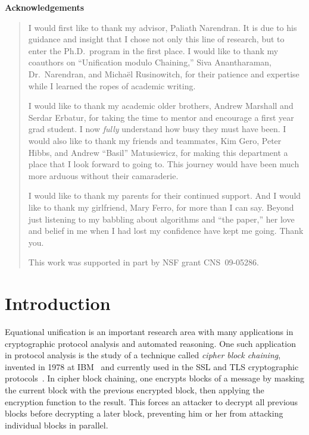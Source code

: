 \documentclass[11pt,twoside,titlepage]{article}
\begin{document}
\clearpage

\begin{center}
    \textbf{Acknowledgements}
\end{center}
\begin{quotation}
I would first like to thank my advisor, Paliath Narendran. It is due to his
guidance and insight that I chose not only this line of research, but to enter
the Ph.D.\ program in the first place.
I would like to thank my coauthors on ``Unification modulo Chaining,'' Siva
Anantharaman, Dr.\ Narendran, and Micha\"{e}l Rusinowitch, for their patience
and expertise while I learned the ropes of academic writing.

I would like to thank my academic older brothers, Andrew Marshall and Serdar
Erbatur, for taking the time to mentor and encourage a first year grad student.
I now \emph{ful{}ly} understand how busy they must have been.
I would also like to thank my friends and teammates, Kim Gero, Peter Hibbs, and
Andrew ``Basil'' Matusiewicz, for making this department a place that I look
forward to going to. This journey would have been much more arduous without
their camaraderie.

I would like to thank my parents for their continued support.
And I would like to thank my girlfriend, Mary Ferro, for more than I can say.
Beyond just listening to my babbling about algorithms and ``the paper,'' her
love and belief in me when I had lost my confidence have kept me going. Thank
you.

This work was supported in part by NSF grant CNS~09-05286.
\end{quotation}

\clearpage
\tableofcontents

\clearpage
{}

\section{Introduction}\label{section:intro}

Equational unification is an important research area with many applications in
cryptographic protocol analysis and automated reasoning. One such application
in protocol analysis is the study of a technique called \emph{cipher block
chaining}, invented in 1978 at IBM~\cite{ehrsam1978message} and currently used
in the SSL and TLS cryptographic protocols~\cite{rfc5246}. In cipher block
chaining, one encrypts blocks of a message by masking the current block with
the previous encrypted block, then applying the encryption function to the
result. This forces an attacker to decrypt all previous blocks before
decrypting a later block, preventing him or her from attacking individual
blocks in parallel.
\end{document}
